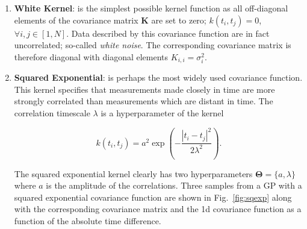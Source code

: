 \begin{enumerate}
\item \textbf{White Kernel}: is the simplest possible kernel function as all 
off-diagonal elements of the covariance matrix $\mathbf{K}$ are set to zero; 
$k(t_i, t_j) = 0$, $\forall i,j \in [1,N]$. 
Data described by this covariance function are in fact uncorrelated; 
so-called \emph{white noise}. The corresponding covariance matrix 
is therefore diagonal with diagonal elements $K_{i,i} = \sigma_i^2$. 

\item \textbf{Squared Exponential}: is perhaps the most widely used covariance 
function. This kernel specifies that measurements made closely in time are more 
strongly correlated 
than measurements which are distant in time. The correlation timescale $\lambda$ is a 
hyperparameter of the kernel 

\begin{equation}
k(t_i, t_j) = a^2 \exp{\left(-\frac{|t_i-t_j|^2}{2\lambda^2} \right)}.
\end{equation}

\noindent The squared exponential kernel clearly has two hyperparameters 
$\mathbf{\Theta} = \{a, \lambda \}$ where $a$ is the amplitude of the 
correlations. Three samples from a GP with a squared exponential covariance function 
are shown in Fig.~\ref{fig:sqexp} along with the corresponding covariance matrix 
and the 1d covariance function as a function of the absolute time difference.


\end{enumerate}

